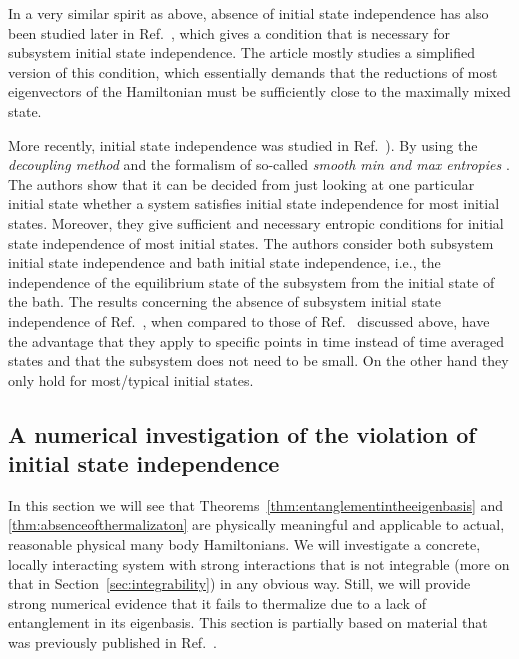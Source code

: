 \documentclass[a4paper,12pt,listof=totoc,index=totoc,bibliography=totoc,headsepline=false,headings=normal,BCOR16.153846mm,DIV12,headinclude,twoside,cleardoublepage=empty,numbers=noenddot,final]{scrreprt}
\theoremstyle{mystyle}
\numberwithin{equation}{section}
\numberwithin{figure}{section}
\numberwithin{lemma}{section}
\numberwithin{theorem}{section}
\numberwithin{corollary}{section}
\numberwithin{definition}{section}
\numberwithin{conjecture}{section}
\numberwithin{observation}{section}
\newcommand{\+}{\mkern2mu}
\DeclareMathOperator{\1}{\mathds{1}}
\begin{document}
In a very similar spirit as above, absence of initial state independence has also been studied later in Ref.~\cite{PhysRevE.82.01}, which gives a condition that is necessary for subsystem initial state independence.
The article mostly studies a simplified version of this condition, which essentially demands that the reductions of most eigenvectors of the Hamiltonian must be sufficiently close to the maximally mixed state.

More recently, initial state independence was studied in Ref.~\cite{Hutter11,MasterThesisHutter}).
By using the \emph{decoupling method} \cite{Dupuis2010,1109.4348v1,Szehr2012} and the formalism of so-called \emph{smooth min and max entropies} \cite{Koenig08,Ciganovic2013}.
The authors show that it can be decided from just looking at one particular initial state whether a system satisfies initial state independence for most initial states.
Moreover, they give sufficient and necessary entropic conditions for initial state independence of most initial states.
The authors consider both subsystem initial state independence and bath initial state independence, i.e., the independence of the equilibrium state of the subsystem from the initial state of the bath.
The results concerning the absence of subsystem initial state independence of Ref.~\cite{Hutter11}, when compared to those of Ref.~\cite{PhysRevLett.10-6} discussed above, have the advantage that they apply to specific points in time instead of time averaged states and that the subsystem does not need to be small.
On the other hand they only hold for most/typical initial states.


\subsection{A numerical investigation of the violation of initial state independence}
\label{sec:anumericalinvestigationoftheviolationofinitialstateindependence}
%
In this section we will see that Theorems~\ref{thm:entanglementintheeigenbasis} and \ref{thm:absenceofthermalizaton} are physically meaningful and applicable to actual, reasonable physical many body Hamiltonians.
We will investigate a concrete, locally interacting system with strong interactions that is not integrable (more on that in Section~\ref{sec:integrability}) in any obvious way.
Still, we will provide strong numerical evidence that it fails to thermalize due to a lack of entanglement in its eigenbasis.
This section is partially based on material that was previously published in Ref.~\cite{PhysRevLett.10-6}.
\end{document}
